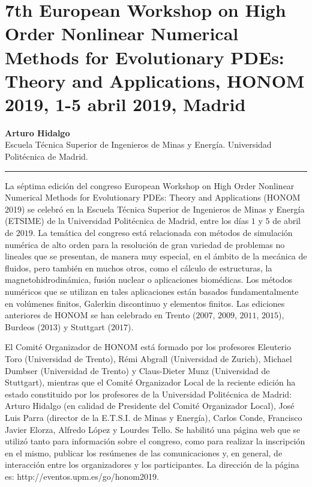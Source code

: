\documentclass[twoside]{article}
\begin{document}
\shorthandoff{>}\shorthandoff{<} %

\section{7th European Workshop on High Order Nonlinear Numerical Methods for Evolutionary PDEs: Theory and Applications, HONOM 2019, 1-5 abril 2019, Madrid}

\begin{center}\large
\textbf{Arturo Hidalgo}\\
Escuela Técnica Superior de Ingenieros de Minas y Energía. Universidad Politécnica de Madrid.  \\
{\color{azulsema}\rule{.5\linewidth}{1pt}}
\end{center}
La séptima edición del congreso European Workshop on High Order Nonlinear Numerical Methods for Evolutionary PDEs: Theory and Applications (HONOM 2019) se celebró en la Escuela Técnica Superior de Ingenieros de Minas y Energía (ETSIME) de la Universidad Politécnica de Madrid, entre los días $1$ y $5$ de abril de $2019$. La temática del congreso está relacionada con métodos de simulación numérica de alto orden para la resolución de gran variedad de problemas no lineales que se presentan, de manera muy especial, en el ámbito de la mecánica de fluidos, pero también en muchos otros, como el cálculo de estructuras, la magnetohidrodinámica, fusión nuclear o aplicaciones biomédicas. Los métodos numéricos que se utilizan en tales aplicaciones están basados fundamentalmente en volúmenes finitos, Galerkin discontinuo y elementos finitos. Las ediciones anteriores de HONOM se han celebrado en Trento ($2007$, $2009$, $2011$, $2015$), Burdeos ($2013$) y Stuttgart ($2017$). 

El Comité Organizador de HONOM está formado por los profesores Eleuterio Toro (Universidad de Trento), Rémi Abgrall (Universidad de Zurich), Michael Dumbser (Universidad de Trento) y Claus-Dieter Munz (Universidad de Stuttgart), mientras que el Comité Organizador Local de la reciente edición ha estado constituido por los profesores de la Universidad Politécnica de Madrid: Arturo Hidalgo (en calidad de Presidente del Comité Organizador Local), José Luis Parra (director de la E.T.S.I. de Minas y Energía), Carlos Conde, Francisco Javier Elorza, Alfredo López y Lourdes Tello. Se habilitó una página web que se utilizó tanto para información sobre el congreso, como para realizar la inscripción en el mismo, publicar los resúmenes de las comunicaciones y, en general, de interacción entre los organizadores y los participantes. La dirección de la página es:
http://eventos.upm.es/go/honom2019.
\end{document}
